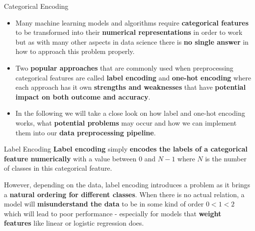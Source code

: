 \documentclass[document.tex]{subfiles}
\begin{document}
    \begin{frame}{Categorical Encoding}
        \begin{itemize}
            \item Many machine learning models and algorithms require \textbf{categorical features} to be transformed into their \textbf{numerical representations} in order to work but as with many other aspects in data science there is \textbf{no single answer} in how to approach this problem properly.
            \item Two \textbf{popular approaches} that are commonly used when preprocessing categorical features are called \textbf{label encoding} and \textbf{one-hot encoding} where each approach has it own \textbf{strengths and weaknesses} that have \textbf{potential impact on both outcome and accuracy}.
            \item In the following we will take a close look on how label and one-hot encoding works, what \textbf{potential problems} may occur and how we can implement them into our \textbf{data preprocessing pipeline}.
        \end{itemize}
    \end{frame}

    \begin{frame}{Label Encoding}
        \textbf{Label encoding} simply \textbf{encodes the labels of a categorical feature numerically} with a value between $0$ and $N-1$ where $N$ is the number of classes in this categorical feature.
        
        \begin{center}
            \begin{minipage}{0.4\textwidth}
                \begin{table}
                    \scalebox{0.8}{}
                \end{table}
            \end{minipage}%
            \begin{minipage}{0.4\textwidth}
                \begin{table}
                    \scalebox{0.8}{}
                \end{table}
            \end{minipage}
        \end{center}
        
        However, depending on the data, label encoding introduces a problem as it brings a \textbf{natural ordering for different classes}. When there is no actual relation, a model will \textbf{misunderstand the data} to be in some kind of order $0 < 1 < 2$ which will lead to poor performance - especially for models that \textbf{weight features} like linear or logistic regression does.
    \end{frame}
\end{document}
